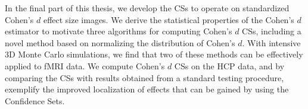 \documentclass[11pt,a4paper]{report}
\begin{document}
\begin{singlespace}
\begin{thesisabstract}
\begin{singlespace}
In the final part of this thesis, we develop the CSs to operate on standardized Cohen's $d$ effect size images. We derive the statistical properties of the Cohen's $d$ estimator to motivate three algorithms for computing Cohen's $d$ CSs, including a novel method based on normalizing the distribution of Cohen's $d$. With intensive 3D Monte Carlo simulations, we find that two of these methods can be effectively applied to fMRI data. We compute Cohen's $d$ CSs on the HCP data, and by comparing the CSs with results obtained from a standard testing procedure, exemplify the improved localization of effects that can be gained by using the Confidence Sets. 

\end{singlespace}
\end{thesisabstract}
\end{singlespace}
\end{document}
